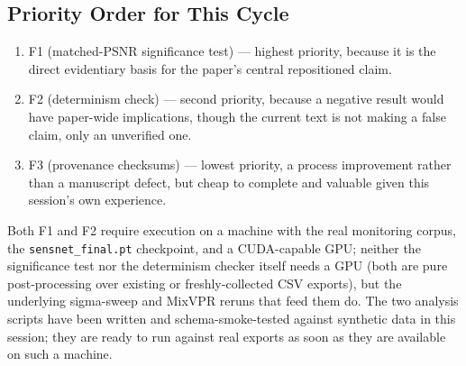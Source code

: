 \documentclass[11pt]{article}
\begin{document}
\subsection*{Priority Order for This Cycle}
\begin{enumerate}
    \item F1 (matched-PSNR significance test) --- highest priority, because
    it is the direct evidentiary basis for the paper's central repositioned
    claim.
    \item F2 (determinism check) --- second priority, because a negative
    result would have paper-wide implications, though the current text is
    not making a false claim, only an unverified one.
    \item F3 (provenance checksums) --- lowest priority, a process
    improvement rather than a manuscript defect, but cheap to complete and
    valuable given this session's own experience.
\end{enumerate}

Both F1 and F2 require execution on a machine with the real monitoring
corpus, the \texttt{sensnet\_final.pt} checkpoint, and a CUDA-capable GPU;
neither the significance test nor the determinism checker itself needs a
GPU (both are pure post-processing over existing or freshly-collected CSV
exports), but the underlying sigma-sweep and MixVPR reruns that feed them do.
The two analysis scripts have been written and schema-smoke-tested against
synthetic data in this session; they are ready to run against real exports
as soon as they are available on such a machine.
\end{document}
